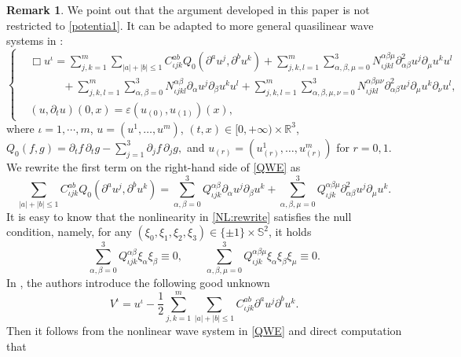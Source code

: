 \documentclass[11pt,twoside]{article}
\def\ds{\displaystyle}
\def\p{\partial}
\def\ve{\varepsilon}
\theoremstyle{plain}
\theoremstyle{definition}
\theoremstyle{assumption}
\newtheorem{remark}{Remark}[section]
\numberwithin{equation}{section}
\begin{document}
\begin{remark}\label{Rem-3-0}
		We point out that the argument developed in this paper is not restricted to
		\eqref{potentia1}. It can be adapted to more general
		quasilinear wave systems in \cite{HouTaoYin2}:
		\begin{equation}\label{QWE}
			\left\{
			\begin{aligned}
				&\Box u^\iota=\sum_{j,k=1}^m\sum_{|a|+|b|\le1}C^{ab}_{\iota jk}Q_0(\p^au^j,\p^bu^k)
				+\sum_{j,k,l=1}^m \sum_{\alpha,\beta,\mu=0}^3N^{\alpha\beta\mu}_{\iota jkl}\p^2_{\alpha\beta}u^j\p_{\mu}u^k u^l\\
				&\qquad\quad+\sum_{j,k,l=1}^m  \sum_{\alpha,\beta=0}^3N^{\alpha\beta}_{\iota jkl}\p_{\alpha}u^j\p_{\beta}u^ku^l
+\sum_{j,k,l=1}^m\sum_{\alpha,\beta,\mu,\nu=0}^3N_{\iota jkl}^{\alpha\beta\mu\nu}\p^2_{\alpha\beta}u^j\p_{\mu}u^k\p_{\nu}u^l,\\
				&(u,\p_tu)(0,x)=\ve (u_{(0)},u_{(1)})(x),
			\end{aligned}
			\right.
		\end{equation}
		where $\iota =1,\cdots,m$, $u=(u^1,\ldots,u^m)$, $(t,x)\in[0,+\infty)\times\mathbb R^3$,
		$
		Q_0(f,g)=\p_t f\,\p_t g-\ds\sum_{j=1}^3\p_j f\,\p_j g,
		$
		and $u_{(r)}=(u^1_{(r)},\ldots,u^m_{(r)})$ for $r=0,1$. We rewrite 		
		the first term on the right-hand side of \eqref{QWE} as
		\begin{equation}\label{NL:rewrite}
			\sum_{|a|+|b|\le1}
			C^{ab}_{\iota jk}Q_0(\p^a u^j,\p^b u^k)
			=
			\sum_{\alpha,\beta=0}^3
			Q_{\iota jk}^{\alpha\beta}
			\p_\alpha u^j\p_\beta u^k
			+
			\sum_{\alpha,\beta,\mu=0}^3
			Q_{\iota jk}^{\alpha\beta\mu}
			\p^2_{\alpha\beta}u^j\p_\mu u^k .
		\end{equation}
		It is easy to know that the nonlinearity in \eqref{NL:rewrite} satisfies  the null condition, namely,
		for any \((\xi_0,\xi_1,\xi_2,\xi_3)\in\{\pm1\}\times\mathbb S^2\), it holds
		\begin{equation}\label{NC:rewrite}
			\sum_{\alpha,\beta=0}^3
			Q_{\iota jk}^{\alpha\beta}\xi_\alpha\xi_\beta
			\equiv0,
			\qquad
			\sum_{\alpha,\beta,\mu=0}^3
			Q_{\iota jk}^{\alpha\beta\mu}
			\xi_\alpha\xi_\beta\xi_\mu
			\equiv0 .
		\end{equation}
		In \cite{HouTaoYin2}, the authors introduce the following good unknown		
		\[ V^\iota=u^\iota-\frac12\sum_{j,k=1}^m\sum_{|a|+|b|\le1}C^{ab}_{\iota jk}\p^au^j\p^bu^k.\]
		Then it follows from the nonlinear wave system in \eqref{QWE} and direct computation that
		\begin{equation}

\end{equation}
\end{remark}
\end{document}
